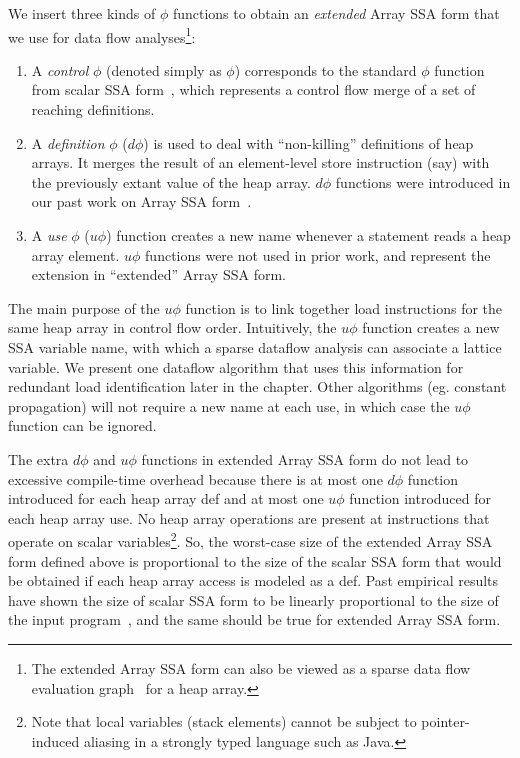 We insert three kinds of $\phi$ functions 
to obtain an {\it extended}
Array SSA form that we use for data flow analyses\footnote{The extended
Array SSA form can also be viewed as a
sparse data flow evaluation graph~\cite{ChCF91} for
a heap array.}:
\begin{enumerate}
\item 
A {\em control} $\phi$ (denoted simply as $\phi$) corresponds to
the standard $\phi$ function from scalar SSA form~\cite{CFRWZ91a},
which represents a  control flow merge of a set of reaching definitions.
\item
A {\em definition} $\phi$ ($d\phi$) 
is used to deal with ``non-killing'' definitions
of heap arrays.  It merges the result of an element-level store instruction
(say) with the previously extant value of the heap array.
$d\phi$ functions were introduced in our past work on Array SSA form~\cite{KnSa98,KnSa98b}.
\item
A {\em use} $\phi$ ($u\phi$) function creates
a new name whenever a statement reads a heap array element.
$u\phi$ functions were not used in prior work, and represent the extension
in ``extended'' Array SSA form.

\end{enumerate}
The main purpose of the $u\phi$ function is to link
together load instructions for the same heap array in control
flow order.   Intuitively, the $u\phi$ function creates a new
SSA variable name, with which a sparse dataflow analysis can
associate a lattice variable.  We present one dataflow algorithm that 
uses this information for redundant load identification later in 
the chapter.  Other algorithms (eg. constant propagation) will not require a 
new name at each use, in which case the $u\phi$ function can be
ignored.

The extra $d\phi$ and $u\phi$
functions in extended Array SSA form do not lead to excessive
compile-time overhead because there is at most one $d\phi$ function introduced
for each heap array def and at most one $u\phi$ function introduced
for each heap array use.
No heap array operations are
present at instructions that operate on scalar variables\footnote{Note that local variables (stack elements) cannot be subject to 
pointer-induced aliasing in a strongly typed language such as Java.}.
So, the worst-case size of the extended Array SSA form defined
above is proportional to the size of the scalar SSA form that would be
obtained if each heap array access is modeled as a def.  Past 
empirical results
have shown the size of scalar SSA form to be linearly proportional to
the size of the input program~\cite{CFRWZ91a}, and the same should be
true for extended Array SSA form.

